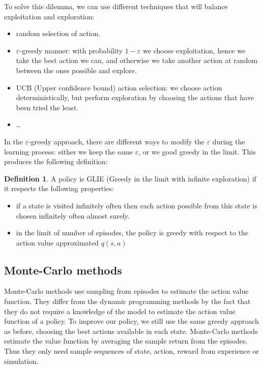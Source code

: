 \documentclass[14pt,a4paper]{article}
\theoremstyle{definition}
\newtheorem{madef}{Definition}
\begin{document}
To solve this dilemma, we can use different techniques that will balance exploitation and exploration:
\begin{itemize}
\item random selection of action.
 \item $\varepsilon$-greedy manner: with probability $1-\varepsilon$ we choose exploitation, hence we take the best action we can, and otherwise we take another action at random between the ones possible and explore.
 \item UCB (Upper confidence bound) action selection: we choose action deterministically, but perform exploration by choosing the actions that have been tried the least.
 \item \ldots
\end{itemize}

In the $\varepsilon$-greedy approach, there are different ways to modify the $\varepsilon$ during the learning process: either we keep the same $\varepsilon$, or we good greedy in the limit. This produces the following definition: 

\begin{madef}
A policy is GLIE (Greedy in the limit with infinite exploration) if it respects the following properties:
\begin{itemize}
\item if a state is visited infinitely often then each action possible from this state is chosen infinitely often almost surely.
\item in the limit of number of episodes, the policy is greedy with respect to the action value approximated $q(s,a)$ 
\end{itemize}
\end{madef}

\subsection{Monte-Carlo methods}
Monte-Carlo methods use sampling from episodes to estimate the action value function.
They differ from the dynamic programming methods by the fact that they do not require a knowledge of the model to estimate the action value function of a policy. To improve our policy, we still use the same greedy approach as before, choosing the best actions available in each state.
Monte-Carlo methods estimate the value function by averaging the sample return from the episodes. Thus they only need sample sequences of state, action, reward from experience or simulation. \citep{Sutton}
\end{document}
